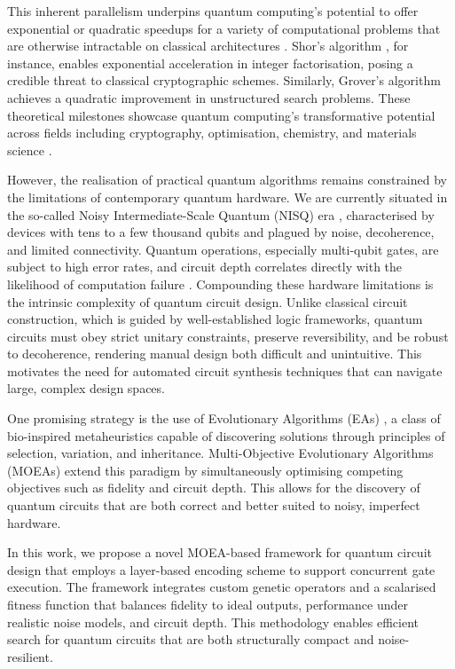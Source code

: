 \documentclass[11pt,a4paper]{article}
\begin{document}
This inherent parallelism underpins quantum computing’s potential to offer exponential or quadratic speedups for a variety of computational problems that are otherwise intractable on classical architectures \cite{nielsen2001quantum}. Shor’s algorithm \cite{Shor365700}, for instance, enables exponential acceleration in integer factorisation, posing a credible threat to classical cryptographic schemes. Similarly, Grover’s algorithm \cite{Khanal2021QuantumML} achieves a quadratic improvement in unstructured search problems. These theoretical milestones showcase quantum computing’s transformative potential across fields including cryptography, optimisation, chemistry, and materials science \cite{hassija2020forthcoming}.\newline

However, the realisation of practical quantum algorithms remains constrained by the limitations of contemporary quantum hardware. We are currently situated in the so-called Noisy Intermediate-Scale Quantum (NISQ) era \cite{Preskill2018QuantumCI}, characterised by devices with tens to a few thousand qubits and plagued by noise, decoherence, and limited connectivity. Quantum operations, especially multi-qubit gates, are subject to high error rates, and circuit depth correlates directly with the likelihood of computation failure \cite{Clerk2008IntroductionTQ}. Compounding these hardware limitations is the intrinsic complexity of quantum circuit design. Unlike classical circuit construction, which is guided by well-established logic frameworks, quantum circuits must obey strict unitary constraints, preserve reversibility, and be robust to decoherence, rendering manual design both difficult and unintuitive. This motivates the need for automated circuit synthesis techniques that can navigate large, complex design spaces.\newline

One promising strategy is the use of Evolutionary Algorithms (EAs) \cite{Lukac2002EvolvingQC}, a class of bio-inspired metaheuristics capable of discovering solutions through principles of selection, variation, and inheritance. Multi-Objective Evolutionary Algorithms (MOEAs) \cite{moein} extend this paradigm by simultaneously optimising competing objectives such as fidelity and circuit depth. This allows for the discovery of quantum circuits that are both correct and better suited to noisy, imperfect hardware.\newline

In this work, we propose a novel MOEA-based framework for quantum circuit design that employs a layer-based encoding scheme to support concurrent gate execution. The framework integrates custom genetic operators and a scalarised fitness function that balances fidelity to ideal outputs, performance under realistic noise models, and circuit depth. This methodology enables efficient search for quantum circuits that are both structurally compact and noise-resilient.\newline
\end{document}
